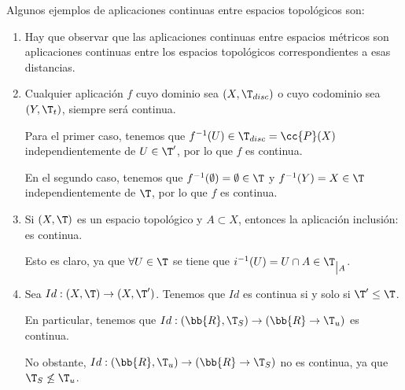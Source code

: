\begin{ejemplo} Algunos ejemplos de aplicaciones continuas entre espacios topológicos son:
    \begin{enumerate}
        \item Hay que observar que las aplicaciones continuas entre espacios métricos son aplicaciones continuas entre los espacios topológicos correspondientes a esas distancias.

        \item Cualquier aplicación $f$ cuyo dominio sea $(X,\T_{disc})$ o cuyo codominio sea $(Y,\T_t)$, siempre será continua.

        Para el primer caso, tenemos que $f^{-1}(U)\in \T_{disc}=\cc{P}(X)$ independientemente de $U\in \T'$, por lo que $f$ es continua.

        En el segundo caso, tenemos que $f^{-1}(\emptyset)=\emptyset \in \T$ y $f^{-1}(Y)=X \in \T$ independientemente de $\T$, por lo que $f$ es continua.

        \item Si $(X,\T)$ es un espacio topológico y $A\subset X$, entonces la aplicación inclusión:
        es continua.

        Esto es claro, ya que $\forall U\in \T$ se tiene que $i^{-1}(U)=U\cap A\in \T_{\big|A}$.

        \item Sea $Id:(X,\T)\to (X,\T')$. Tenemos que $Id$ es continua si y solo si $\T'\leq \T$.

        En particular, tenemos que $Id:(\bb{R},\T_S)\to (\bb{R}\to \T_u)$ es continua.

        No obstante, $Id:(\bb{R},\T_u)\to (\bb{R}\to \T_S)$ no es continua, ya que $\T_S\not\leq \T_u$.
    \end{enumerate}
\end{ejemplo}

